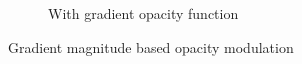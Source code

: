 \begin{figure}[ht]
\begin{subfigure}[b]{0.5\columnwidth}
    \caption{With gradient opacity function}
    \label{fig:Ng2}
  \end{subfigure}
  \caption{Gradient magnitude based opacity modulation}
  \label{fig:gradient}
\end{figure}
